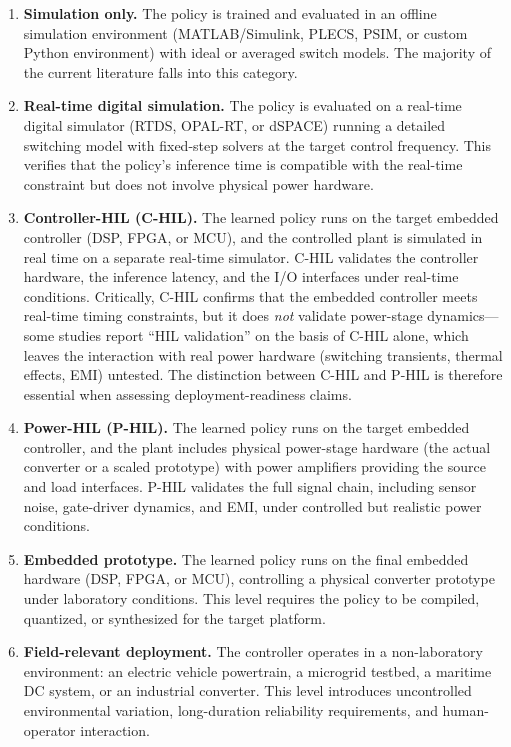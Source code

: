 \documentclass[manuscript,screen,review]{acmart}
\begin{document}
\begin{enumerate}
  \item \textbf{Simulation only.} The policy is trained and evaluated in an offline simulation environment (MATLAB/Simulink, PLECS, PSIM, or custom Python environment) with ideal or averaged switch models. The majority of the current literature falls into this category.
  \item \textbf{Real-time digital simulation.} The policy is evaluated on a real-time digital simulator (RTDS, OPAL-RT, or dSPACE) running a detailed switching model with fixed-step solvers at the target control frequency. This verifies that the policy's inference time is compatible with the real-time constraint but does not involve physical power hardware.
  \item \textbf{Controller-HIL (C-HIL).} The learned policy runs on the target embedded controller (DSP, FPGA, or MCU), and the controlled plant is simulated in real time on a separate real-time simulator. C-HIL validates the controller hardware, the inference latency, and the I/O interfaces under real-time conditions. Critically, C-HIL confirms that the embedded controller meets real-time timing constraints, but it does \emph{not} validate power-stage dynamics---some studies report ``HIL validation'' on the basis of C-HIL alone, which leaves the interaction with real power hardware (switching transients, thermal effects, EMI) untested. The distinction between C-HIL and P-HIL is therefore essential when assessing deployment-readiness claims.
  \item \textbf{Power-HIL (P-HIL).} The learned policy runs on the target embedded controller, and the plant includes physical power-stage hardware (the actual converter or a scaled prototype) with power amplifiers providing the source and load interfaces. P-HIL validates the full signal chain, including sensor noise, gate-driver dynamics, and EMI, under controlled but realistic power conditions.
  \item \textbf{Embedded prototype.} The learned policy runs on the final embedded hardware (DSP, FPGA, or MCU), controlling a physical converter prototype under laboratory conditions. This level requires the policy to be compiled, quantized, or synthesized for the target platform.
  \item \textbf{Field-relevant deployment.} The controller operates in a non-laboratory environment: an electric vehicle powertrain, a microgrid testbed, a maritime DC system, or an industrial converter. This level introduces uncontrolled environmental variation, long-duration reliability requirements, and human-operator interaction.
\end{enumerate}
\end{document}
